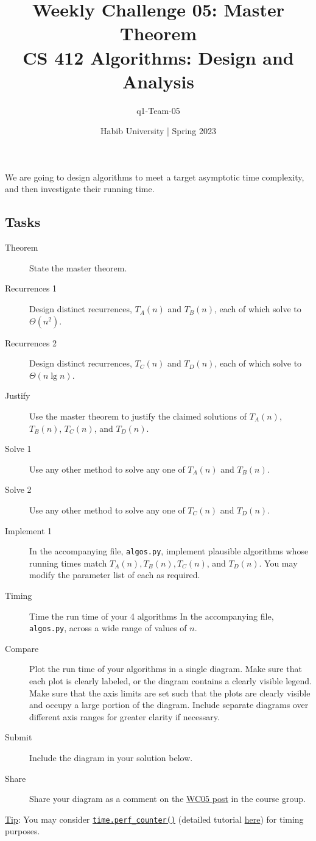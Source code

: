 \documentclass[a4paper]{exam}
\title{Weekly Challenge 05: Master Theorem\\CS 412 Algorithms: Design and Analysis}
\author{q1-Team-05}  %
\date{Habib University | Spring 2023}
\begin{document}
\maketitle

\begin{questions}

  

  We are going to design algorithms to meet a target asymptotic time complexity, and then investigate their running time.

  \subsection*{Tasks}
  \begin{description}
  \item[Theorem] State the master theorem.
  \item[Recurrences 1] Design distinct recurrences, $T_A(n)$ and $T_B(n)$, each of which solve to $\Theta(n^2)$.
  \item[Recurrences 2] Design distinct recurrences, $T_C(n)$ and $T_D(n)$, each of which solve to $\Theta(n\lg n)$.
  \item[Justify] Use the master theorem to justify the claimed solutions of  $T_A(n)$, $T_B(n)$, $T_C(n)$, and $T_D(n)$.
  \item[Solve 1] Use any other method to solve any one of  $T_A(n)$ and $T_B(n)$.
  \item[Solve 2] Use any other method to solve any one of  $T_C(n)$ and $T_D(n)$.
  \item[Implement 1] In the accompanying file, \texttt{algos.py}, implement plausible algorithms whose running times match $T_A(n),T_B(n), T_C(n)$, and $T_D(n)$. You may modify the parameter list of each as required.
  \item[Timing] Time the run time of your 4 algorithms In the accompanying file, \texttt{algos.py}, across a wide range of values of $n$.
  \item[Compare] Plot the run time of your algorithms in a single diagram. Make sure that each plot is clearly labeled, or the diagram contains a clearly visible legend. Make sure that the axis limits are set such that the plots are clearly visible and occupy a large portion of the diagram. Include separate diagrams over different axis ranges for greater clarity if necessary.
  \item[Submit] Include the diagram in your solution below.
  \item[Share] Share your diagram as a comment on the \href{https://web.yammer.com/main/org/habib.edu.pk/threads/eyJfdHlwZSI6IlRocmVhZCIsImlkIjoiMjEyMzI4NzkzMzY4MTY2NCJ9}{WC05 post} in the course group.
  \end{description}
  \underline{Tip}: You may consider \href{https://stackoverflow.com/a/68054319/1382487}{\texttt{time.perf\_counter()}} (detailed tutorial \href{https://realpython.com/python-timer/#other-python-timer-functions}{here}) for timing purposes.
  

\end{questions}
\end{document}
